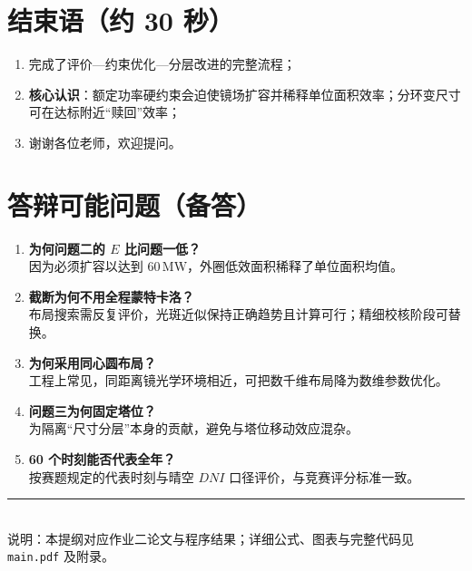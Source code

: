 \documentclass[12pt,a4paper]{ctexart}
\begin{document}
\section{结束语（约 30 秒）}
\begin{enumerate}
  \item 完成了评价—约束优化—分层改进的完整流程；
  \item \textbf{核心认识}：额定功率硬约束会迫使镜场扩容并稀释单位面积效率；分环变尺寸可在达标附近“赎回”效率；
  \item 谢谢各位老师，欢迎提问。
\end{enumerate}

\section{答辩可能问题（备答）}
\begin{enumerate}
  \item \textbf{为何问题二的 $E$ 比问题一低？}\\
  因为必须扩容以达到 $60\,\mathrm{MW}$，外圈低效面积稀释了单位面积均值。
  \item \textbf{截断为何不用全程蒙特卡洛？}\\
  布局搜索需反复评价，光斑近似保持正确趋势且计算可行；精细校核阶段可替换。
  \item \textbf{为何采用同心圆布局？}\\
  工程上常见，同距离镜光学环境相近，可把数千维布局降为数维参数优化。
  \item \textbf{问题三为何固定塔位？}\\
  为隔离“尺寸分层”本身的贡献，避免与塔位移动效应混杂。
  \item \textbf{60 个时刻能否代表全年？}\\
  按赛题规定的代表时刻与晴空 $DNI$ 口径评价，与竞赛评分标准一致。
\end{enumerate}

\vspace{1.5em}
\noindent\rule{\textwidth}{0.4pt}\\[0.5em]
{\small 说明：本提纲对应作业二论文与程序结果；详细公式、图表与完整代码见 \texttt{main.pdf} 及附录。}
\end{document}
